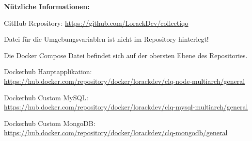 \textbf{Nützliche Informationen:}\par
\vspace{0.5cm}
GitHub Repository: \url{https://github.com/LorackDev/collectiqo}\par
Datei für die Umgebungsvariablen ist nicht im Repository hinterlegt!\par
Die Docker Compose Datei befindet sich auf der obersten Ebene des Repositories.\par

\vspace{0.5cm}
Dockerhub Hauptapplikation: \url{https://hub.docker.com/repository/docker/lorackdev/clq-node-multiarch/general}\par
Dockerhub Custom MySQL: \url{https://hub.docker.com/repository/docker/lorackdev/clq-mysql-multiarch/general}\par
Dockerhub Custom MongoDB: \url{https://hub.docker.com/repository/docker/lorackdev/clq-mongodb/general}\par